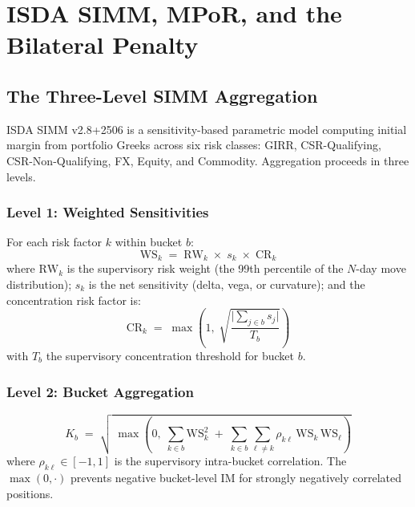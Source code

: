 \documentclass[12pt,letterpaper]{article}
\numberwithin{equation}{section}
\theoremstyle{remark}
\newcommand{\RW}{\mathrm{RW}}
\newcommand{\WS}{\mathrm{WS}}
\newcommand{\CR}{\mathrm{CR}}
\newcommand{\Kb}{K_b}
\begin{document}
\section{ISDA SIMM, MPoR, and the Bilateral Penalty}
\label{sec:simm}

\subsection{The Three-Level SIMM Aggregation}

ISDA SIMM v2.8+2506 is a sensitivity-based parametric model computing
initial margin from portfolio Greeks across six risk classes: GIRR,
CSR-Qualifying, CSR-Non-Qualifying, FX, Equity, and Commodity. Aggregation
proceeds in three levels.

\subsubsection*{Level 1: Weighted Sensitivities}

For each risk factor $k$ within bucket $b$:
\begin{equation}
  \WS_k \;=\; \RW_k \;\times\; s_k \;\times\; \CR_k
  \label{eq:ws}
\end{equation}
where $\RW_k$ is the supervisory risk weight (the 99th percentile of the
$N$-day move distribution); $s_k$ is the net sensitivity (delta, vega, or
curvature); and the concentration risk factor is:
\begin{equation}
  \CR_k \;=\; \max\!\left(1,\;
  \sqrt{\frac{\bigl|\sum_{j \in b} s_j\bigr|}{T_b}}\right)
  \label{eq:cr}
\end{equation}
with $T_b$ the supervisory concentration threshold for bucket $b$.

\subsubsection*{Level 2: Bucket Aggregation}

\begin{equation}
  \Kb \;=\; \sqrt{\;\max\!\left(0,\;\sum_{k \in b}\WS_k^2
  \;+\;\sum_{k \in b}\sum_{\ell \neq k}\rho_{k\ell}\,\WS_k\,\WS_\ell
  \right)}
  \label{eq:bucket}
\end{equation}
where $\rho_{k\ell} \in [-1,1]$ is the supervisory intra-bucket correlation.
The $\max(0,\cdot)$ prevents negative bucket-level IM for strongly
negatively correlated positions.
\end{document}
